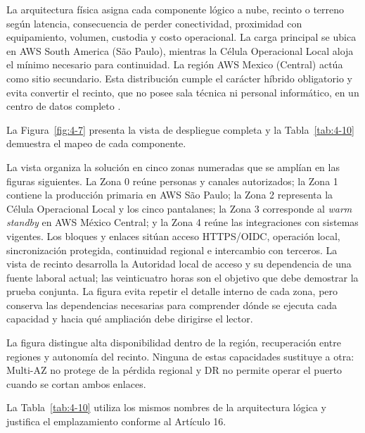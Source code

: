 La arquitectura física asigna cada componente lógico a nube, recinto o terreno según latencia, consecuencia de perder conectividad, proximidad con equipamiento, volumen, custodia y costo operacional. La carga principal se ubica en AWS South America (São Paulo), mientras la Célula Operacional Local aloja el mínimo necesario para continuidad. La región AWS Mexico (Central) actúa como sitio secundario. Esta distribución cumple el carácter híbrido obligatorio y evita convertir el recinto, que no posee sala técnica ni personal informático, en un centro de datos completo \parencites[art. 16, pp. 11--12]{pucv-admin}[caps. 4 y 17.4]{caso07}.

La Figura~\ref{fig:4-7} presenta la vista de despliegue completa y la Tabla~\ref{tab:4-10} demuestra el mapeo de cada componente.



La vista organiza la solución en cinco zonas numeradas que se amplían en las figuras siguientes. La Zona 0 reúne personas y canales autorizados; la Zona 1 contiene la producción primaria en AWS São Paulo; la Zona 2 representa la Célula Operacional Local y los cinco pantalanes; la Zona 3 corresponde al \emph{warm standby} en AWS México Central; y la Zona 4 reúne las integraciones con sistemas vigentes. Los bloques y enlaces sitúan acceso HTTPS/OIDC, operación local, sincronización protegida, continuidad regional e intercambio con terceros. La vista de recinto desarrolla la Autoridad local de acceso y su dependencia de una fuente laboral actual; las veinticuatro horas son el objetivo que debe demostrar la prueba conjunta. La figura evita repetir el detalle interno de cada zona, pero conserva las dependencias necesarias para comprender dónde se ejecuta cada capacidad y hacia qué ampliación debe dirigirse el lector.

La figura distingue alta disponibilidad dentro de la región, recuperación entre regiones y autonomía del recinto. Ninguna de estas capacidades sustituye a otra: Multi-AZ no protege de la pérdida regional y DR no permite operar el puerto cuando se cortan ambos enlaces.

La Tabla~\ref{tab:4-10} utiliza los mismos nombres de la arquitectura lógica y justifica el emplazamiento conforme al Artículo 16.


